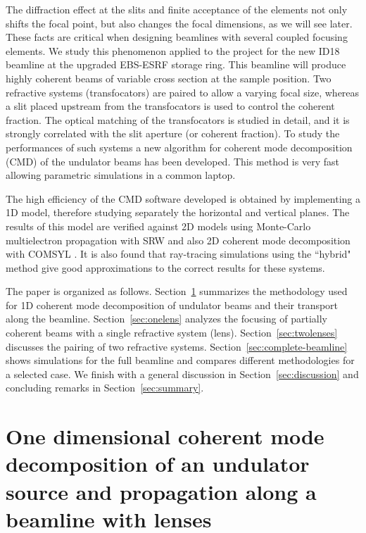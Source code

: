 \documentclass{iucr}              %
\begin{document}
The diffraction effect at the slits and finite acceptance of the elements not only shifts the focal point, but also changes the focal dimensions, as we will see later. These facts are critical when designing beamlines with several coupled focusing elements. We study this phenomenon applied to the project for the new ID18 beamline at the upgraded EBS-ESRF storage ring. This beamline will produce highly coherent beams of variable cross section at the sample position. Two refractive systems (transfocators) are paired to allow a varying focal size, whereas a slit placed upstream from the transfocators is used to control the coherent fraction. The optical matching of the transfocators is studied in detail, and it is strongly correlated with the slit aperture (or coherent fraction). To study the performances of such systems a new algorithm for coherent mode decomposition (CMD) of the undulator beams has been developed. This method is very fast allowing parametric simulations in a common laptop.

The high efficiency of the CMD software developed is obtained by implementing a 1D model, therefore studying separately the horizontal and vertical planes. The results of this model are verified against 2D models using Monte-Carlo multielectron propagation with SRW and also 2D coherent mode decomposition with COMSYL \cite{codeCOMSYL}. It is also found that ray-tracing simulations using the ``hybrid" method \cite{codeHYBRID} give good approximations to the correct results for these systems. 

The paper is organized as follows. Section~\ref{sec:theory} summarizes the methodology used for 1D coherent mode decomposition of undulator beams and their transport along the beamline. Section~\ref{sec:onelens} analyzes the focusing of partially coherent beams with a single refractive system (lens). Section~\ref{sec:twolenses} discusses the pairing of two refractive systems. Section~\ref{sec:complete-beamline} shows simulations for the full beamline and compares different methodologies for a selected case. We finish with a general discussion in Section~\ref{sec:discussion} and  concluding remarks in Section~\ref{sec:summary}. 


\section{One dimensional coherent mode decomposition of an undulator source and propagation along a beamline with lenses}\label{sec:theory}
\end{document}
